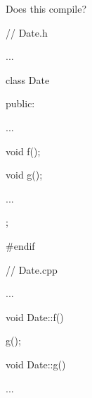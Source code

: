 Does this compile?



\begin{consolethree}[escapeinside=||]

// Date.h

...

class Date

{

public:

    ...

    void f();

    void g();

    ...

};



#endif

\end{consolethree}



\begin{consolethree}[escapeinside=||]

// Date.cpp

...

void Date::f()

{

    g();

}



void Date::g()

{

}

...

\end{consolethree}

